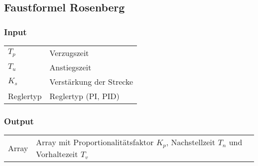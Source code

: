 %


\clearpage
\subsection{Faustformel Rosenberg}
\label{app:algo:rosenberg}

\subsubsection*{Input}

\begin{tabular}{p{40mm}l}
    $ T_p $        & Verzugszeit \\
    $ T_u $        & Anstiegszeit \\
    $ K_s $        & Verst\"arkung der Strecke \\
      Reglertyp    & Reglertyp (PI, PID)
\end{tabular}

\subsubsection*{Output}
\begin{tabular}{p{40mm}l}
    Array & \parbox[t][4em][s]{0.7\textwidth}{Array mit Proportionalit\"atsfaktor $ K_p $, Nachstellzeit $ T_n $ und Vorhaltezeit $ T_v $}
\end{tabular}

